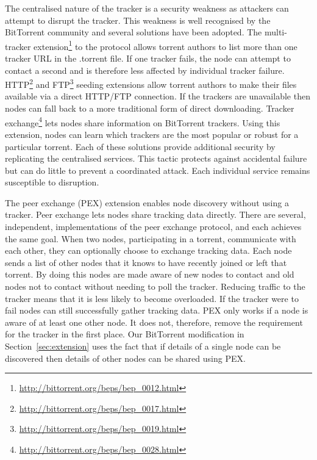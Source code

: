     The centralised nature of the tracker is a security weakness as attackers can attempt to disrupt the tracker. This weakness is well recognised by the BitTorrent community and several solutions have been adopted. The multi-tracker extension\footnote{\url{http://bittorrent.org/beps/bep_0012.html}} to the protocol allows torrent authors to list more than one tracker URL in the .torrent file. If one tracker fails, the node can attempt to contact a second and is therefore less affected by individual tracker failure. HTTP\footnote{\url{http://bittorrent.org/beps/bep_0017.html}} and FTP\footnote{\url{http://bittorrent.org/beps/bep_0019.html}} seeding extensions allow torrent authors to make their files available via a direct HTTP/FTP connection. If the trackers are unavailable then nodes can fall back to a more traditional form of direct downloading. Tracker exchange\footnote{\url{http://bittorrent.org/beps/bep_0028.html}} lets nodes share information on BitTorrent trackers. Using this extension, nodes can learn which trackers are the most popular or robust for a particular torrent. Each of these solutions provide additional security by replicating the centralised services. This tactic protects against accidental failure but can do little to prevent a coordinated attack. Each individual service remains susceptible to disruption.

    The peer exchange (PEX) \cite{Wu} extension enables node discovery without using a tracker. Peer exchange lets nodes share tracking data directly. There are several, independent, implementations of the peer exchange protocol\cite{Wu}, and each achieves the same goal. When two nodes, participating in a torrent, communicate with each other, they can optionally choose to exchange tracking data. Each node sends a list of other nodes that it knows to have recently joined or left that torrent. By doing this nodes are made aware of new nodes to contact and old nodes not to contact without needing to poll the tracker. Reducing traffic to the tracker means that it is less likely to become overloaded. If the tracker were to fail nodes can still successfully gather tracking data. PEX only works if a node is aware of at least one other node. It does not, therefore, remove the requirement for the tracker in the first place. Our BitTorrent modification in Section~\ref{sec:extension} uses the fact that if details of a single node can be discovered then details of other nodes can be shared using PEX.

